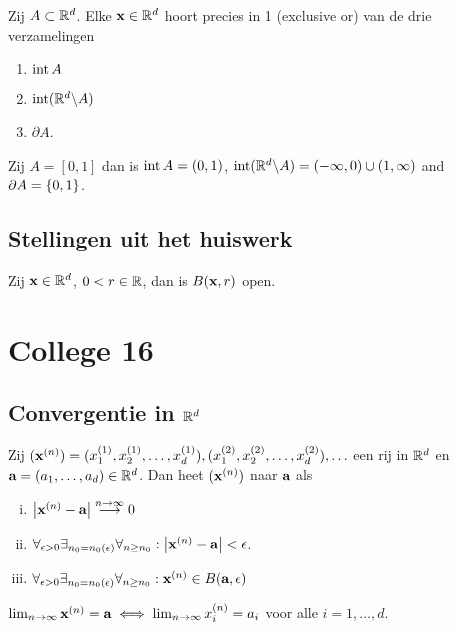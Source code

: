 \documentclass{2wa40summary}
\begin{document}
	\begin{lemma}
		Zij $A\subset\mathbb{R}^d$.
		Elke ${\textbf{x}} \in \mathbb{R}^d$ hoort precies in 1 (exclusive or) van de drie verzamelingen
		\begin{enumerate}
			\item $\operatorname{\mathop{int}} A$
			\item $\operatorname{\mathop{int}} (\mathbb{R}^d\backslash A)$
			\item $\partial A$.
		\end{enumerate}
	\end{lemma}
	\begin{voorbeeld}
		Zij $A = [0,1]$ dan is $\operatorname{\mathop{int}} A=(0,1)$, $\operatorname{\mathop{int}} (\mathbb{R}^d\backslash A)=(-\infty,0)\cup(1,\infty)$
		and $\partial A = \lbrace0,1\rbrace$.
	\end{voorbeeld}
	
	\subsection{Stellingen uit het huiswerk}
	\begin{theorem}
		Zij ${\textbf{x}} \in \mathbb{R}^d$, $0<r\in\mathbb{R}$, dan is $B({\textbf{x}},r)$ open.
	\end{theorem}
	\newpage
	\section{College 16}
	\subsection{Convergentie in $\mathbb{R}^d$}
	\begin{define}
		Zij $({\textbf{x}}^{(n)}) = (x^{(1)}_1,x^{(1)}_2,\ldots,x^{(1)}_d), (x^{(2)}_1,x^{(2)}_2,\ldots,x^{(2)}_d), \ldots$
		een rij in $\mathbb{R}^d$ en ${\textbf{a}} =(a_1, \dots ,a_d ) \in \mathbb{R}^d$. Dan heet $({\textbf{x}}^{(n)})$  naar ${\textbf{a}}$ als
		\begin{enumerate}[(i)]
			\item ${\left|{\textbf{x}}^{(n)}-{\textbf{a}}\right|}\stackrel{n\to \infty}{\longrightarrow} 0$
			\item $\forall _{\epsilon >0} \exists _{n_0=n_0(\epsilon)} \forall _{n\geq n_0} : \abs{\x\up{n} - \a} < \epsilon$.
			\item $\forall _{\epsilon >0} \exists _{n_0=n_0(\epsilon)} \forall _{n\geq n_0} : \x\up{n} \in B(\a,\epsilon )$
		\end{enumerate}
	\end{define}		
	\begin{theorem}
		$\lim_{n\to\infty}{\textbf{x}}^{(n)}={\textbf{a}} \iff \lim_{n\to\infty} x^{(n)}_{i} = a_i$ voor alle $i=1,\ldots ,d$.
	\end{theorem}
	
\end{document}
